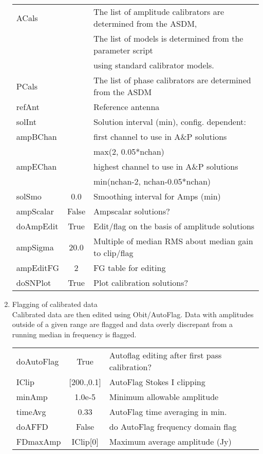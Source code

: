 \documentclass[11pt]{article}
\begin{document}
\begin{enumerate}
\begin{center}
\begin{tabular}{|l|c|l|}
ACals  &  & The list of amplitude calibrators are determined from the ASDM, \\
  &  & The list of models is determined from the parameter script \\
  & & using standard calibrator models. \\
PCals  &  &  The list of phase calibrators are determined from the ASDM\\
refAnt  &  & Reference antenna \\
solInt  &  &  Solution interval (min), config. dependent:\\
ampBChan  &  & first channel to use in A\&P solutions \\
  &  &   max(2, 0.05*nchan)\\
ampEChan  &  &  highest channel to use in A\&P solutions\\
  &  &  min(nchan-2, nchan-0.05*nchan)\\
solSmo  & 0.0 &  Smoothing interval for Amps (min)\\
ampScalar  & False &  Ampscalar solutions?\\
doAmpEdit  & True  & Edit/flag on the basis of amplitude solutions \\
ampSigma  & 20.0 &  Multiple of median RMS about median gain to clip/flag\\
ampEditFG  & 2 &  FG table for editing \\
doSNPlot       & True &  Plot calibration solutions?\\
\hline
\end{tabular}
\end{center}
%
\item Flagging of calibrated data\\
Calibrated data are then edited using Obit/AutoFlag. 
Data with amplitudes outside of a given range are flagged and data
overly discrepant from a running median in frequency is flagged.
\begin{center}
\begin{tabular}{|l|c|l|}
\hline
doAutoFlag  & True &  Autoflag editing after first pass calibration?\\
IClip     & [200.,0.1] &  AutoFlag Stokes I clipping\\
minAmp    & 1.0e-5 & Minimum allowable amplitude \\
timeAvg   & 0.33 &  AutoFlag time averaging in min.\\
doAFFD    & False & do AutoFlag frequency domain flag \\
FDmaxAmp  & IClip[0] &  Maximum average amplitude (Jy)\\

\end{tabular}
\end{center}
\end{enumerate}
\end{document}
